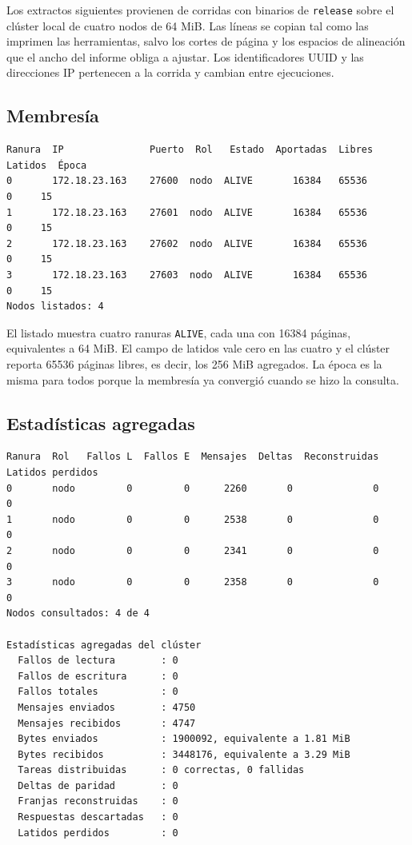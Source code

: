 Los extractos siguientes provienen de corridas con binarios de \texttt{release} sobre el clúster local de cuatro nodos de 64 MiB. Las líneas se copian tal como las imprimen las herramientas, salvo los cortes de página y los espacios de alineación que el ancho del informe obliga a ajustar. Los identificadores UUID y las direcciones IP pertenecen a la corrida y cambian entre ejecuciones.

\subsection{Membresía}

\begin{lstlisting}[caption={Extracto de \texttt{dsmctl nodes} con la membresía del clúster local; se omite la columna UUID y se abrevian los encabezados para ajustar el ancho.}, label={lst:salida-nodes}]
Ranura  IP               Puerto  Rol   Estado  Aportadas  Libres  Latidos  Época
0       172.18.23.163    27600  nodo  ALIVE       16384   65536        0     15
1       172.18.23.163    27601  nodo  ALIVE       16384   65536        0     15
2       172.18.23.163    27602  nodo  ALIVE       16384   65536        0     15
3       172.18.23.163    27603  nodo  ALIVE       16384   65536        0     15
Nodos listados: 4
\end{lstlisting}

El listado muestra cuatro ranuras \texttt{ALIVE}, cada una con 16384 páginas, equivalentes a 64 MiB. El campo de latidos vale cero en las cuatro y el clúster reporta 65536 páginas libres, es decir, los 256 MiB agregados. La época es la misma para todos porque la membresía ya convergió cuando se hizo la consulta.

\subsection{Estadísticas agregadas}

\begin{lstlisting}[caption={Extracto de \texttt{dsmctl stats} después de una corrida de \texttt{matmul}.}, label={lst:salida-stats}]
Ranura  Rol   Fallos L  Fallos E  Mensajes  Deltas  Reconstruidas  Latidos perdidos
0       nodo         0         0      2260       0              0                 0
1       nodo         0         0      2538       0              0                 0
2       nodo         0         0      2341       0              0                 0
3       nodo         0         0      2358       0              0                 0
Nodos consultados: 4 de 4

Estadísticas agregadas del clúster
  Fallos de lectura        : 0
  Fallos de escritura      : 0
  Fallos totales           : 0
  Mensajes enviados        : 4750
  Mensajes recibidos       : 4747
  Bytes enviados           : 1900092, equivalente a 1.81 MiB
  Bytes recibidos          : 3448176, equivalente a 3.29 MiB
  Tareas distribuidas      : 0 correctas, 0 fallidas
  Deltas de paridad        : 0
  Franjas reconstruidas    : 0
  Respuestas descartadas   : 0
  Latidos perdidos         : 0
\end{lstlisting}

